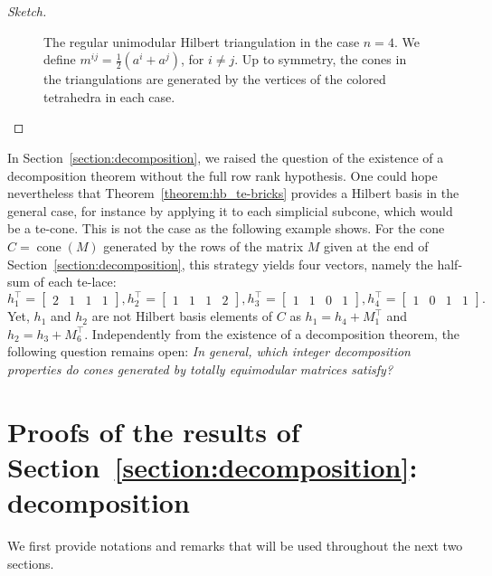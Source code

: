 \documentclass[11pt,a4paper]{amsart}
\theoremstyle{plain}
\theoremstyle{definition}
\DeclareMathOperator{\cone}{cone}
\begin{document}
\begin{proof}[Sketch]
\begin{figure}[!ht]
\begin{subfigure}{0.66\textwidth}
			\label{fig:second}
		\end{subfigure}
		\caption{The regular unimodular Hilbert triangulation in the case $n=4$. We define $m^{ij}=\frac{1}{2}(a^i+a^j)$, for $i\neq j$. Up to symmetry, the cones in the triangulations are generated by the vertices of the colored tetrahedra in each case.}
		\label{figure:triangulation}
	\end{figure}
	\end{proof}

In Section~\ref{section:decomposition}, we raised the question of the existence of a decomposition theorem without the full row rank hypothesis.
One could hope nevertheless that Theorem~\ref{theorem:hb_te-bricks} provides a Hilbert basis in the general case, for instance by applying it to each simplicial subcone, which would be a te-cone. 
This is not the case as the following example shows.
For the cone $C=\cone(M)$ generated by the rows of the matrix $M$ given at the end of Section~\ref{section:decomposition}, this strategy yields four vectors, namely the half-sum of each te-lace:
$$h_1^\top=\begin{bmatrix}
	2&1&1&1
\end{bmatrix},
h_2^\top=\begin{bmatrix}
	1&1&1&2
\end{bmatrix},
h_3^\top=\begin{bmatrix}
	1&1&0&1
\end{bmatrix},
h_4^\top=\begin{bmatrix}
	1&0&1&1
\end{bmatrix}.$$
Yet, $h_1$ and $h_2$ are not Hilbert basis elements of $C$ as $h_1 = h_4+M_1^\top$ and $h_2 = h_3+M_6^\top$.
Independently from the existence of a decomposition theorem, the following question remains open:
\textit{In general, which integer decomposition properties do cones generated by totally equimodular matrices satisfy?}


\section{Proofs of the results of Section~\ref{section:decomposition}: decomposition}\label{section:proofs_decomposition}
We first provide notations and remarks that will be used throughout the next two sections.
\end{document}
